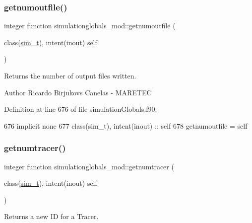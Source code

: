 \subsubsection{\texorpdfstring{getnumoutfile()}{getnumoutfile()}}
{\footnotesize\ttfamily integer function simulationglobals\+\_\+mod\+::getnumoutfile (\begin{DoxyParamCaption}\item[{class(\mbox{\hyperlink{structsimulationglobals__mod_1_1sim__t}{sim\+\_\+t}}), intent(inout)}]{self }\end{DoxyParamCaption})\hspace{0.3cm}{\ttfamily [private]}}



Returns the number of output files written. 

\begin{DoxyAuthor}{Author}
Ricardo Birjukovs Canelas -\/ M\+A\+R\+E\+T\+EC 
\end{DoxyAuthor}


Definition at line 676 of file simulation\+Globals.\+f90.


\begin{DoxyCode}
676     \textcolor{keywordtype}{implicit none}
677     \textcolor{keywordtype}{class}(sim\_t), \textcolor{keywordtype}{intent(inout)} :: self
678     getnumoutfile = self%
\end{DoxyCode}
\mbox{\label{namespacesimulationglobals__mod_ac4915156236196940b31ff02d53af295}} 
\subsubsection{\texorpdfstring{getnumtracer()}{getnumtracer()}}
{\footnotesize\ttfamily integer function simulationglobals\+\_\+mod\+::getnumtracer (\begin{DoxyParamCaption}\item[{class(\mbox{\hyperlink{structsimulationglobals__mod_1_1sim__t}{sim\+\_\+t}}), intent(inout)}]{self }\end{DoxyParamCaption})\hspace{0.3cm}{\ttfamily [private]}}



Returns a new ID for a Tracer. 

